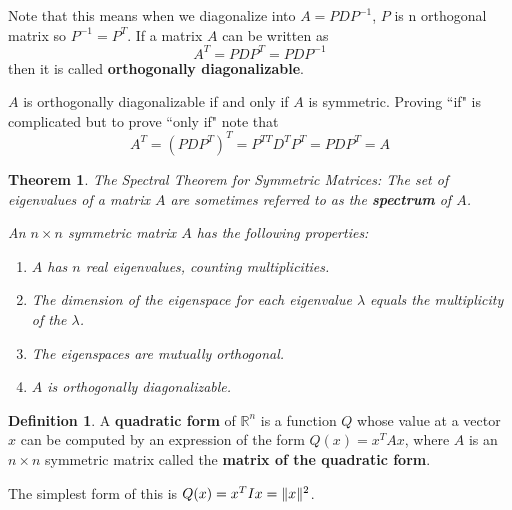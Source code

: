 \documentclass[letterpaper]{article}
\newtheorem{theorem}{Theorem}
\theoremstyle{definition}
\newtheorem{definition}{Definition}[section]
\DeclarePairedDelimiter{\norm}{\lVert}{\rVert}
\begin{document}
Note that this means when we diagonalize into $A = PDP^{-1}$, $P$ is n orthogonal matrix so $P^{-1} = P^{T}$. If a matrix $A$ can be written as 
$$A^{T} = PDP^{T} = PDP^{-1}$$
then it is called \textbf{orthogonally diagonalizable}. 

$A$ is orthogonally diagonalizable if and only if $A$ is symmetric. Proving ``if" is complicated but to prove ``only if" note that 
$$A^{T} = (PDP^{T})^{T} = P^{TT}D^{T}P^{T} = PDP^{T} = A$$

\begin{theorem}{The Spectral Theorem for Symmetric Matrices: }
The set of eigenvalues of a matrix $A$ are sometimes referred to as the \textbf{spectrum} of $A$. 

An $n \times n$ symmetric matrix $A$ has the following properties: 
\begin{enumerate}
	\item $A$ has $n$ real eigenvalues, counting multiplicities. 
	\item The dimension of the eigenspace for each eigenvalue $\lambda$ equals the multiplicity of the $\lambda$. 
	\item The eigenspaces are mutually orthogonal. 
	\item $A$ is orthogonally diagonalizable. 
\end{enumerate}
\end{theorem}

\begin{definition}
A \textbf{quadratic form} of $\mathbb{R}^n$ is a function $Q$ whose value at a vector $x$ can be computed by an expression of the form $Q(x) =x^{T} Ax$, where $A$ is an $n \times n$ symmetric matrix called the \textbf{matrix of the quadratic form}. 

The simplest form of this is $Q(x) = x^{T} Ix = \norm{x}^{2}$. 
\end{definition}
\end{document}
